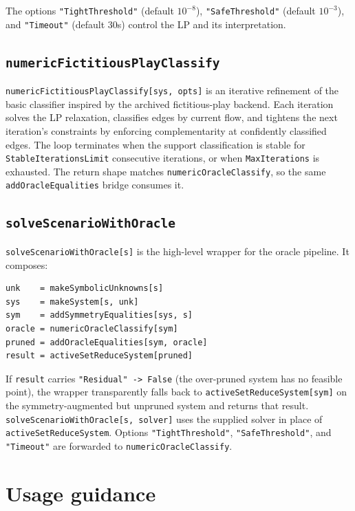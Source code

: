 \documentclass[11pt]{article}
\begin{document}
The options \texttt{"TightThreshold"} (default \(10^{-8}\)), \texttt{"SafeThreshold"} (default \(10^{-3}\)), and \texttt{"Timeout"} (default 30s) control the LP and its interpretation.

\subsection*{\texttt{numericFictitiousPlayClassify}}

\texttt{numericFictitiousPlayClassify[sys, opts]} is an iterative refinement of the basic classifier inspired by the archived fictitious-play backend. Each iteration solves the LP relaxation, classifies edges by current flow, and tightens the next iteration's constraints by enforcing complementarity at confidently classified edges. The loop terminates when the support classification is stable for \texttt{StableIterationsLimit} consecutive iterations, or when \texttt{MaxIterations} is exhausted. The return shape matches \texttt{numericOracleClassify}, so the same \texttt{addOracleEqualities} bridge consumes it.

\subsection*{\texttt{solveScenarioWithOracle}}

\texttt{solveScenarioWithOracle[s]} is the high-level wrapper for the oracle pipeline. It composes:

\begin{verbatim}
unk    = makeSymbolicUnknowns[s]
sys    = makeSystem[s, unk]
sym    = addSymmetryEqualities[sys, s]
oracle = numericOracleClassify[sym]
pruned = addOracleEqualities[sym, oracle]
result = activeSetReduceSystem[pruned]
\end{verbatim}

If \texttt{result} carries \texttt{"Residual" -> False} (the over-pruned system has no feasible point), the wrapper transparently falls back to \texttt{activeSetReduceSystem[sym]} on the symmetry-augmented but unpruned system and returns that result. \texttt{solveScenarioWithOracle[s, solver]} uses the supplied solver in place of \texttt{activeSetReduceSystem}. Options \texttt{"TightThreshold"}, \texttt{"SafeThreshold"}, and \texttt{"Timeout"} are forwarded to \texttt{numericOracleClassify}.

\section{Usage guidance}
\end{document}
